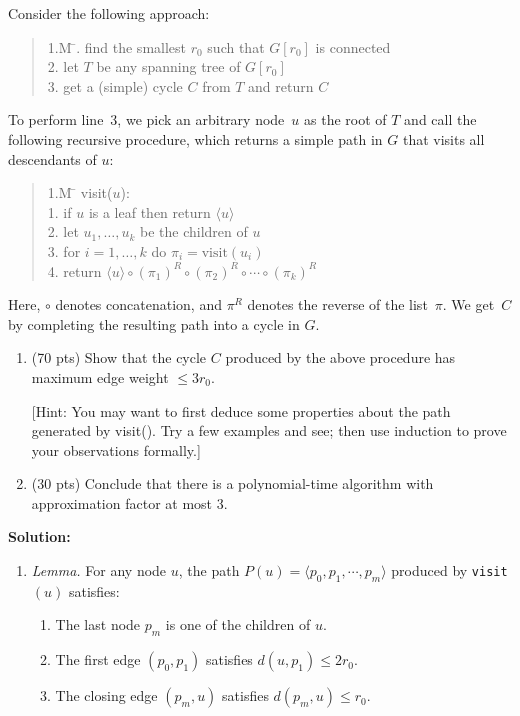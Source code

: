 \documentclass[11pt]{article}
\begin{document}
\begin{description}
Consider the following approach:
\begin{quote}
\begin{tabbing}
1.M \=.\> find the smallest $r_0$ such that $G[r_0]$ is connected\\
2.\> let $T$ be any spanning tree of $G[r_0]$\\
3.\> get a (simple) cycle $C$ from $T$ and return $C$
\end{tabbing}
\end{quote}
To perform line~3, we pick an arbitrary node~$u$
as the root of $T$ and call the following recursive procedure,
which returns a simple path in $G$ that visits all descendants of $u$:
\begin{quote}
\begin{tabbing}
1.M \=\kill
visit($u$):\\
1.\> if $u$ is a leaf then return $\langle u\rangle$\\
2.\> let $u_1,\ldots,u_k$ be the children of $u$\\
3.\> for $i=1,\ldots,k$ do $\pi_i=\mbox{visit}(u_i)$\\
4.\> return $\langle u\rangle \circ (\pi_1)^R \circ (\pi_2)^R \circ\cdots \circ (\pi_k)^R$
\end{tabbing}
\end{quote}
Here, $\circ$ denotes concatenation, and $\pi^R$ denotes the reverse
of the list~$\pi$.  We get~$C$ by completing
the resulting path into a cycle in $G$.  

\begin{enumerate}
\item[(a)] (70 pts) Show that the cycle $C$ produced by the above procedure has
maximum edge weight $\le 3r_0$.  

[Hint: You may want to first deduce some
properties about the path generated by visit().  Try a few examples
and see; then use induction to prove your observations formally.]

\medskip
\item[(b)] (30 pts) Conclude that there is a polynomial-time algorithm with
approximation factor at most 3.  
\end{enumerate}

\newpage
\textbf{Solution:}

\begin{enumerate}
\item[(a)]
\textit{Lemma.} For any node $u$, the path $P(u) = \langle p_0, p_1,\cdots,p_m \rangle$ produced by \texttt{visit}$(u)$ satisfies:
\begin{enumerate}
    \item The last node $p_m$ is one of the children of $u$.
    \item The first edge $(p_0, p_1)$ satisfies $d(u, p_1) \le 2r_0$.
    \item The closing edge $(p_m, u)$ satisfies $d(p_m, u) \le r_0$.
\end{enumerate}


\end{enumerate}
\end{description}
\end{document}
